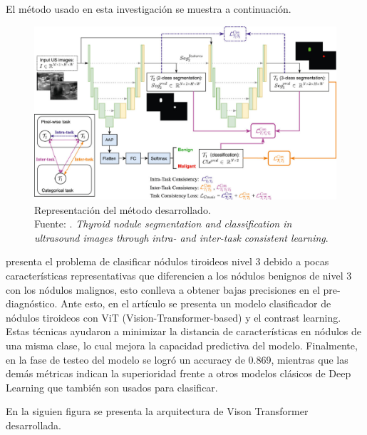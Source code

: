 El método usado en esta investigación se muestra a continuación.

\begin{figure}[H]
	\begin{center}
		\includegraphics[width=1.00\textwidth]{2/figures/antecedente_4.jpg}
		\caption[Representación del método desarrollado]{Representación del método desarrollado. \\
		Fuente: \cite{pr_kang2022thysegclass}. \textit{Thyroid nodule segmentation and classification in ultrasound images through intra- and inter-task consistent learning}.}
		\label{2:fig101}
	\end{center}
\end{figure}


\cite{pr_sun2023classthynvit} presenta el problema de clasificar nódulos tiroideos nivel 3 debido a pocas características representativas que diferencien a los nódulos benignos de nivel 3 con los nódulos malignos, esto conlleva a obtener bajas precisiones en el pre-diagnóstico. Ante esto, en el artículo se presenta un modelo clasificador de nódulos tiroideos con ViT (Vision-Transformer-based) y el contrast learning. Estas técnicas ayudaron a minimizar la distancia de características en nódulos de una misma clase, lo cual mejora la capacidad predictiva del modelo. Finalmente, en la fase de testeo del modelo se logró un accuracy de 0.869, mientras que las demás métricas indican la superioridad frente a otros modelos clásicos de Deep Learning que también son usados para clasificar.

En la siguien figura se presenta la arquitectura de Vison Transformer desarrollada.

